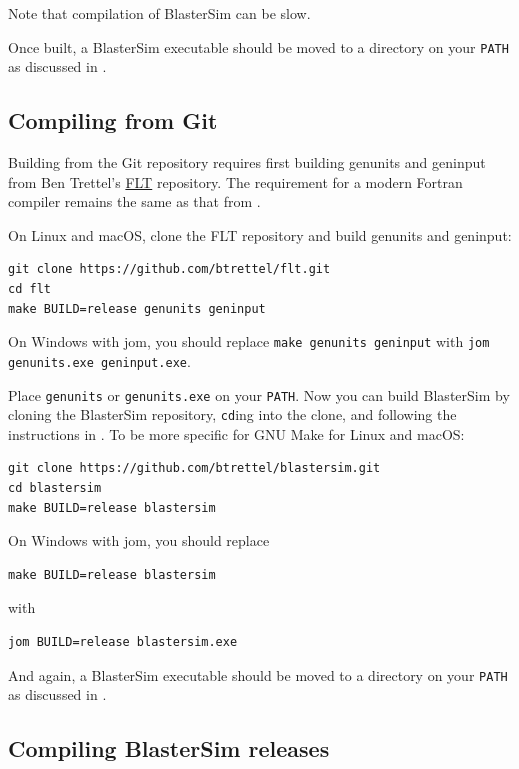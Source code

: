 Note that compilation of BlasterSim can be slow.

Once built, a BlasterSim executable should be moved to a directory on your \texttt{PATH} as discussed in .

\subsection{Compiling from Git}\label{compiling-git}

Building from the Git repository requires first building genunits and geninput from Ben Trettel's \href{https://github.com/btrettel/flt/}{FLT} repository.
The requirement for a modern Fortran compiler remains the same as that from .

On Linux and macOS, clone the FLT repository and build genunits and geninput:
\begin{lstlisting}
git clone https://github.com/btrettel/flt.git
cd flt
make BUILD=release genunits geninput
\end{lstlisting}

On Windows with jom, you should replace \texttt{make genunits geninput} with \texttt{jom genunits.exe geninput.exe}.

Place \texttt{genunits} or \texttt{genunits.exe} on your \texttt{PATH}.
Now you can build BlasterSim by cloning the BlasterSim repository, \texttt{cd}ing into the clone, and following the instructions in .
To be more specific for GNU Make for Linux and macOS: %
\begin{lstlisting}
git clone https://github.com/btrettel/blastersim.git
cd blastersim
make BUILD=release blastersim
\end{lstlisting}

On Windows with jom, you should replace
\begin{lstlisting}
make BUILD=release blastersim
\end{lstlisting}
with
\begin{lstlisting}
jom BUILD=release blastersim.exe
\end{lstlisting}

And again, a BlasterSim executable should be moved to a directory on your \texttt{PATH} as discussed in .

\subsection{Compiling BlasterSim releases}\label{compiling-releases}

